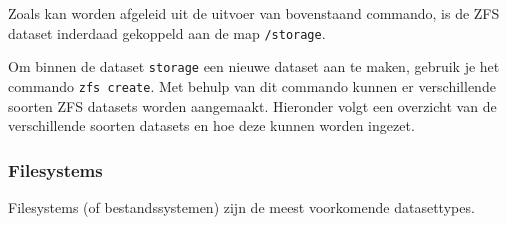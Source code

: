 Zoals kan worden afgeleid uit de uitvoer van bovenstaand commando, is de ZFS dataset inderdaad gekoppeld aan de map \texttt{/storage}.

Om binnen de dataset \texttt{storage} een nieuwe dataset aan te maken, gebruik je het commando \texttt{zfs create}. Met behulp van dit commando kunnen er verschillende soorten ZFS datasets worden aangemaakt. Hieronder volgt een overzicht van de verschillende soorten datasets en hoe deze kunnen worden ingezet.

\subsubsection{Filesystems}

Filesystems (of bestandssystemen) zijn de meest voorkomende datasettypes.
